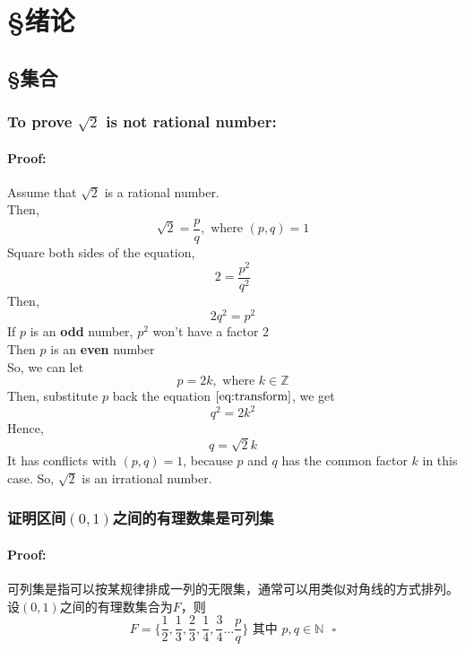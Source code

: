 \documentclass{article}
\begin{document}
\section{\S 绪论}
\subsection{\S 集合}
\subsubsection{To prove $ \sqrt{2} $ is not rational number:}
\paragraph{Proof:}
Assume that $\sqrt{2}$ is a rational number.\\
Then, 
\begin{equation*}
    \sqrt{2} = \frac{p}{q}, \text{ where } (p, q) = 1
\end{equation*}
Square both sides of the equation,
\begin{equation*}
    2 = \frac{p^2}{q^2}
\end{equation*}
Then, 
\begin{equation}
    2q^2 = p^2
    \label{eq:transform}
\end{equation}
If $p$ is an \textbf{odd} number, $p^2$ won't have a factor $2$\\
Then $p$ is an \textbf{even} number \\
So, we can let 
\begin{equation*}
    p = 2k, \text{ where } k \in \mathbb{Z}
\end{equation*}
Then, substitute $p$ back the equation $\ref{eq:transform}$, we get
\begin{equation*}
    q^2 = 2k^2
\end{equation*}
Hence, 
\begin{equation*}
    q = \sqrt{2}k
\end{equation*}
It has conflicts with $(p, q) = 1$, because $p$ and $q$ has the common factor $k$ in this case.
So, $\sqrt{2}$ is an irrational number. \square

\subsubsection{证明区间$(0, 1)$之间的有理数集是可列集}
\paragraph{Proof:}
可列集是指可以按某规律排成一列的无限集，通常可以用类似对角线的方式排列。\\
设$(0, 1)$之间的有理数集合为$F$，则
\begin{equation*}
    F = \{\frac{1}{2}, \frac{1}{3}, \frac{2}{3}, \frac{1}{4}, \frac{3}{4} \dots{} \frac{p}{q}\} \text{ 其中 } p, q \in \mathbb{N} \text{ } \square
\end{equation*}
\end{document}
